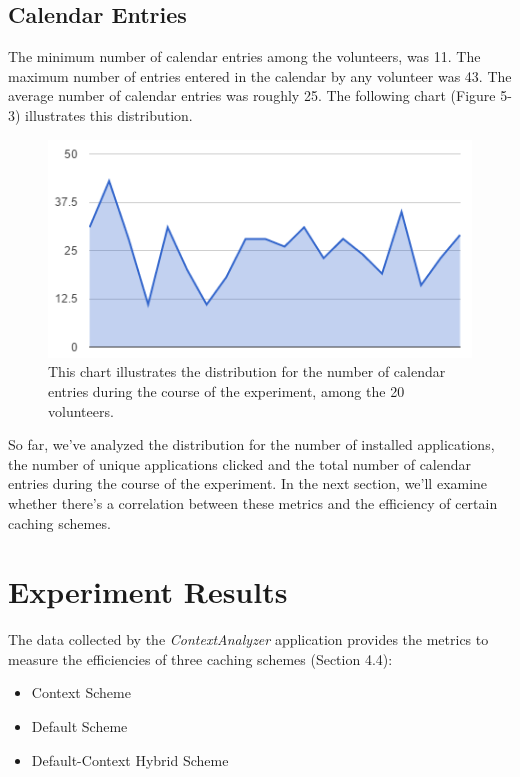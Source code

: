 \documentclass[12pt]{uthesis-v12}  %
\begin{document}
			\subsection{Calendar Entries}
				The minimum number of calendar entries among the volunteers, was 11. The maximum number of entries entered in the calendar by any volunteer was 43. The average number of calendar entries was roughly 25. The following chart (Figure 5-3) illustrates this distribution.
				
				\begin{figure}[h]
					\centering
					\includegraphics[width = 130mm]{images/calendarEntries.png}
					\caption[Distribution of Number of Calendar Entries]{This chart illustrates the distribution for the number of calendar entries during the course of the experiment, among the 20 volunteers.}
				\end{figure}		
			
			So far, we've analyzed the distribution for the number of installed applications, the number of unique applications clicked and the total number of calendar entries during the course of the experiment. In the next section, we'll examine whether there's a correlation between these metrics and the efficiency of certain caching schemes.
			
		\section{Experiment Results}
			The data collected by the {\em ContextAnalyzer} application provides the metrics to measure the efficiencies of three caching schemes (Section 4.4):
			
			\begin{itemize}
				\item Context Scheme
				\item Default Scheme
				\item Default-Context Hybrid Scheme
			\end{itemize}
			
\end{document}
